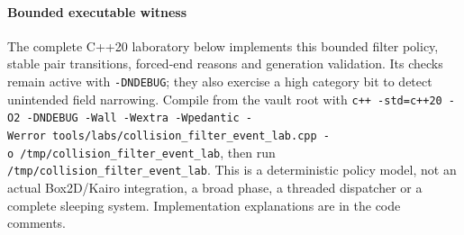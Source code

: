 \paragraph{Bounded executable witness}\label{bounded-executable-witness}

The complete C++20 laboratory below implements this bounded filter policy, stable pair transitions, forced-end reasons and generation validation. Its checks remain active with \texttt{-DNDEBUG}; they also exercise a high category bit to detect unintended field narrowing. Compile from the vault root with \texttt{c++\ -std=c++20\ -O2\ -DNDEBUG\ -Wall\ -Wextra\ -Wpedantic\ -Werror\ tools/labs/collision\_filter\_event\_lab.cpp\ -o\ /tmp/collision\_filter\_event\_lab}, then run \texttt{/tmp/collision\_filter\_event\_lab}. This is a deterministic policy model, not an actual Box2D/Kairo integration, a broad phase, a threaded dispatcher or a complete sleeping system. Implementation explanations are in the code comments.

